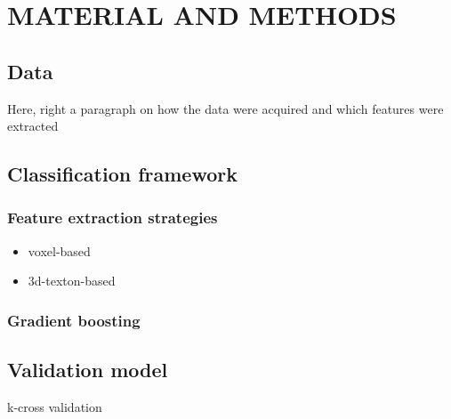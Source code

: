\section{MATERIAL AND METHODS}\label{sec:methodology}


\subsection{Data}\label{subsec:data}

Here, right a paragraph on how the data were acquired and which features were extracted

\subsection{Classification framework}

\subsubsection{Feature extraction strategies}

\begin{itemize}
\item voxel-based
\item 3d-texton-based
\end{itemize}

\subsubsection{Gradient boosting}

\subsection{Validation model}

k-cross validation

